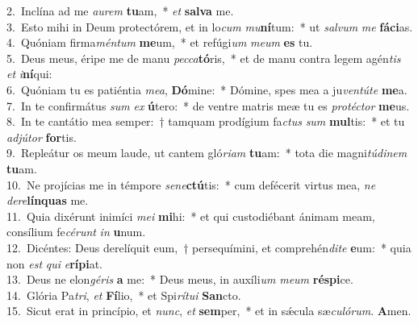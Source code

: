 {2.~}Inclína ad me \textit{au}\textit{rem} \textbf{tu}am,~* \textit{et} \textbf{sal}\textbf{va} me.\\
{3.~}Esto mihi in Deum protectórem, et in lo\textit{cum} \textit{mu}\textbf{ní}tum:~* ut \textit{sal}\textit{vum} \textit{me} \textbf{fá}\textbf{ci}as.\\
{4.~}Quóniam firma\textit{mén}\textit{tum} \textbf{me}um,~* et refúgi\textit{um} \textit{me}\textit{um} \textbf{es} tu.\\
{5.~}Deus meus, éripe me de manu \textit{pec}\textit{ca}\textbf{tó}ris,~* et de manu contra legem agén\textit{tis} \textit{et} \textit{i}\textbf{ní}qui:\\
{6.~}Quóniam tu es patiéntia \textit{me}\textit{a}, \textbf{Dó}mine:~* Dómine, spes mea a ju\textit{ven}\textit{tú}\textit{te} \textbf{me}a.\\
{7.~}In te confirmátus \textit{sum} \textit{ex} \textbf{ú}tero:~* de ventre matris meæ tu es \textit{pro}\textit{té}\textit{ctor} \textbf{me}us.\\
{8.~}In te cantátio mea semper:~† tamquam prodígium fa\textit{ctus} \textit{sum} \textbf{mul}tis:~* et tu \textit{ad}\textit{jú}\textit{tor} \textbf{for}tis.\\
{9.~}Repleátur os meum laude, ut cantem gló\textit{ri}\textit{am} \textbf{tu}am:~* tota die magni\textit{tú}\textit{di}\textit{nem} \textbf{tu}am.\\
{10.~}Ne projícias me in témpore \textit{se}\textit{ne}\textbf{ctú}tis:~* cum defécerit virtus mea, \textit{ne} \textit{de}\textit{re}\textbf{lín}\textbf{quas} me.\\
{11.~}Quia dixérunt inimíci \textit{me}\textit{i} \textbf{mi}hi:~* et qui custodiébant ánimam meam, consílium fe\textit{cé}\textit{runt} \textit{in} \textbf{u}num.\\
{12.~}Dicéntes: Deus derelíquit eum,~† persequímini, et comprehén\textit{di}\textit{te} \textbf{e}um:~* quia non \textit{est} \textit{qui} \textit{e}\textbf{rí}\textbf{pi}at.\\
{13.~}Deus ne elon\textit{gé}\textit{ris} \textbf{a} me:~* Deus meus, in auxíli\textit{um} \textit{me}\textit{um} \textbf{ré}\textbf{spi}ce.\\
{14.~}Glória Pa\textit{tri}, \textit{et} \textbf{Fí}lio,~* et Spi\textit{rí}\textit{tu}\textit{i} \textbf{San}cto.\\
{15.~}Sicut erat in princípio, et \textit{nunc}, \textit{et} \textbf{sem}per,~* et in sǽcula sæ\textit{cu}\textit{ló}\textit{rum}. \textbf{A}men.\\
